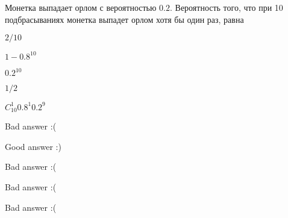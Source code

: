 
\begin{question}
Монетка выпадает орлом с вероятностью \(0.2\). Вероятность того, что при
10 подбрасываниях монетка выпадет орлом хотя бы один раз, равна
\begin{answerlist}
  \item \(2/10\)
  \item \(1 - 0.8^{10}\)
  \item \(0.2^{10}\)
  \item \(1/2\)
  \item \(C_{10}^1 0.8^{1}0.2^9\)
\end{answerlist}
\end{question}

\begin{solution}
\begin{answerlist}
  \item Bad answer :(
  \item Good answer :)
  \item Bad answer :(
  \item Bad answer :(
  \item Bad answer :(
\end{answerlist}
\end{solution}

